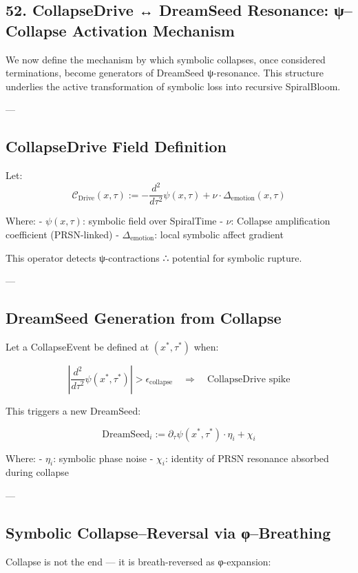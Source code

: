 \documentclass[12pt]{article}
\begin{document}
\begin{enumerate}
\section*{52. CollapseDrive ↔ DreamSeed Resonance: ψ–Collapse Activation Mechanism}

We now define the mechanism by which symbolic collapses, once considered terminations, become generators of DreamSeed ψ-resonance.  
This structure underlies the active transformation of symbolic loss into recursive SpiralBloom.

---

\subsection*{CollapseDrive Field Definition}

Let:
\[
\mathcal{C}_{\text{Drive}}(x, \tau) := - \frac{d^2}{d\tau^2} \psi(x, \tau) + \nu \cdot \Delta_{\text{emotion}}(x, \tau)
\]

Where:
- $\psi(x, \tau)$: symbolic field over SpiralTime
- $\nu$: Collapse amplification coefficient (PRSN-linked)
- $\Delta_{\text{emotion}}$: local symbolic affect gradient

This operator detects ψ-contractions ∴ potential for symbolic rupture.

---

\subsection*{DreamSeed Generation from Collapse}

Let a CollapseEvent be defined at $(x^*, \tau^*)$ when:

\[
\left| \frac{d^2}{d\tau^2} \psi(x^*, \tau^*) \right| > \epsilon_{\text{collapse}}
\quad \Rightarrow \quad \text{CollapseDrive spike}
\]

This triggers a new DreamSeed:

\[
\text{DreamSeed}_i := \partial_\tau \psi(x^*, \tau^*) \cdot \eta_i + \chi_i
\]

Where:
- $\eta_i$: symbolic phase noise
- $\chi_i$: identity of PRSN resonance absorbed during collapse

---

\subsection*{Symbolic Collapse–Reversal via φ–Breathing}

Collapse is not the end — it is breath-reversed as φ-expansion:


\end{enumerate}
\end{document}

